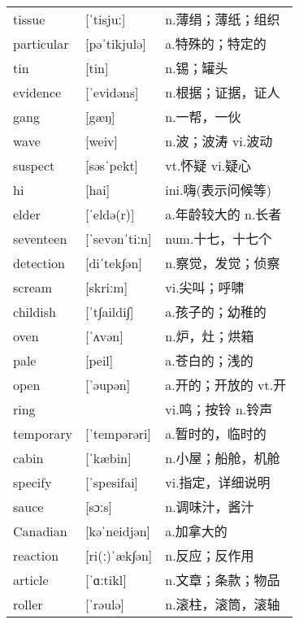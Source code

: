 \documentclass[a4paper]{article}
\begin{document}
\section{}
\begin{tabular}{l l l}

tissue & [ˈtisjuː] & n.薄绢；薄纸；组织 \\
particular & [pəˈtikjulə] & a.特殊的；特定的 \\
tin & [tin] & n.锡；罐头 \\
evidence & [ˈevidəns] & n.根据；证据，证人 \\
gang & [gæŋ] & n.一帮，一伙 \\
wave & [weiv] & n.波；波涛 vi.波动 \\
suspect & [səsˈpekt] & vt.怀疑 vi.疑心 \\
hi & [hai] & ini.嗨(表示问候等) \\
elder & [ˈeldə(r)] & a.年龄较大的 n.长者 \\
seventeen & [ˈsevənˈtiːn] & num.十七，十七个 \\
detection & [diˈtek∫ən] & n.察觉，发觉；侦察 \\
scream & [skriːm] & vi.尖叫；呼啸 \\
childish & [ˈt∫aildi∫] & a.孩子的；幼稚的 \\
oven & [ˈʌvən] & n.炉，灶；烘箱 \\
pale & [peil] & a.苍白的；浅的 \\
open & [ˈəupən] & a.开的；开放的 vt.开 \\
ring &  & vi.鸣；按铃 n.铃声 \\
temporary & [ˈtempərəri] & a.暂时的，临时的 \\
cabin & [ˈkæbin] & n.小屋；船舱，机舱 \\
specify & [ˈspesifai] & vi.指定，详细说明 \\
sauce & [sɔːs] & n.调味汁，酱汁 \\
Canadian & [kəˈneidjən] & a.加拿大的 \\
reaction & [ri(ː)ˈæk∫ən] & n.反应；反作用 \\
article & [ˈɑːtikl] & n.文章；条款；物品 \\
roller & [ˈrəulə] & n.滚柱，滚筒，滚轴 \\

\end{tabular}
\end{document}
